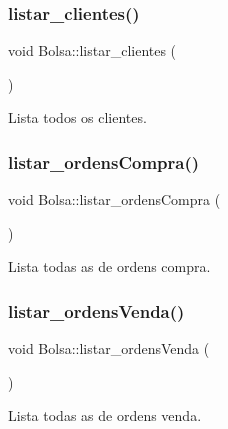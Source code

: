 \subsubsection{\texorpdfstring{listar\+\_\+clientes()}{listar\_clientes()}}
{\footnotesize\ttfamily void Bolsa\+::listar\+\_\+clientes (\begin{DoxyParamCaption}{ }\end{DoxyParamCaption})}



Lista todos os clientes. 

\hypertarget{class_bolsa_a419cf3df5db87b4925eb616af1180f88}{}\label{class_bolsa_a419cf3df5db87b4925eb616af1180f88} 
\subsubsection{\texorpdfstring{listar\+\_\+ordens\+Compra()}{listar\_ordensCompra()}}
{\footnotesize\ttfamily void Bolsa\+::listar\+\_\+ordens\+Compra (\begin{DoxyParamCaption}{ }\end{DoxyParamCaption})}



Lista todas as de ordens compra. 

\hypertarget{class_bolsa_abd28d5b93c338a05deccf0adbac23ba1}{}\label{class_bolsa_abd28d5b93c338a05deccf0adbac23ba1} 
\subsubsection{\texorpdfstring{listar\+\_\+ordens\+Venda()}{listar\_ordensVenda()}}
{\footnotesize\ttfamily void Bolsa\+::listar\+\_\+ordens\+Venda (\begin{DoxyParamCaption}{ }\end{DoxyParamCaption})}



Lista todas as de ordens venda. 

\hypertarget{class_bolsa_ad96a358bf03c103f55b8139da8a0d61a}{}\label{class_bolsa_ad96a358bf03c103f55b8139da8a0d61a} 

